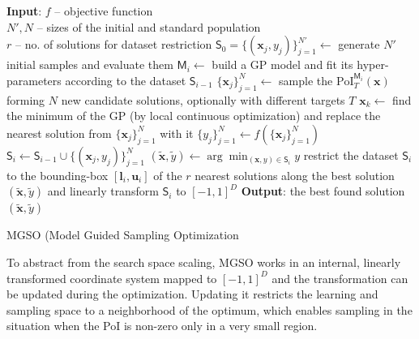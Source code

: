 \documentclass{itatnew}
\newcommand{\xx}{\mathrm{\mathbf{x}}}
\begin{document}
\begin{algorithm}[t]
\begin{algorithmic}[1]
{\small
  \STATE \textbf{Input}: $f$ -- objective function \\
      \quad $N', N$ -- sizes of the initial and standard population \\
      \quad $r$ -- no. of solutions for dataset restriction
  \STATE $\mathsf{S}_0 = \{(\xx_j, y_j)\}_{j=1}^{N'} \leftarrow$ generate $N'$ initial samples 
      and evaluate them %
    \STATE $\mathsf{M}_i \leftarrow$ build a GP model and fit its hyper-parameters
        according to the dataset $\mathsf{S}_{i-1}$
    \STATE $\{\xx_j\}_{j=1}^{N}  \leftarrow$ sample the $\textrm{PoI}_T^{\mathsf{M}_i}(\xx)$ 
        forming $N$ new candidate solutions, optionally with different targets $T$
    \STATE $\xx_k \leftarrow$ find the minimum of the GP (by local continuous optimization) and replace the nearest solution from $\{\xx_j\}_{j=1}^{N}$ with it
    \STATE $\{y_j\}_{j=1}^N \leftarrow f(\{\xx_j\}_{j=1}^N)$  \hspace{\fill}   
    \STATE $\mathsf{S}_i \leftarrow \mathsf{S}_{i-1} \cup \{(\xx_j, y_j)\}_{j=1}^N$  \hspace{\fill}   
    \STATE $(\tilde{\xx}, \tilde{y}) \leftarrow \arg \min_{(\xx,y) \in \mathsf{S}_i} y$  \hspace{\fill}  
    \STATE restrict the dataset $\mathsf{S}_i$ to the bounding-box $[\mathbf{l}_i,\mathbf{u}_i]$ of the $r$ nearest solutions along the best solution $(\tilde{\xx},\tilde{y})$ and linearly transform $\mathsf{S}_i$ to $[-1, 1]^D$
    \ENDIF
  \ENDWHILE
  \STATE \textbf{Output}: the best found solution $(\tilde{\xx}, \tilde{y})$
}
\end{algorithmic}
\caption{MGSO (Model Guided Sampling Optimization}
\label{alg:mgso}
\end{algorithm}

To abstract from the search space scaling, MGSO works in an internal, linearly transformed coordinate system mapped to $[-1, 1]^D$ and the transformation can be updated during the optimization. Updating it restricts the learning and sampling space to a neighborhood of the optimum, which enables sampling in the situation when the PoI is non-zero only in a very small region.
\end{document}
